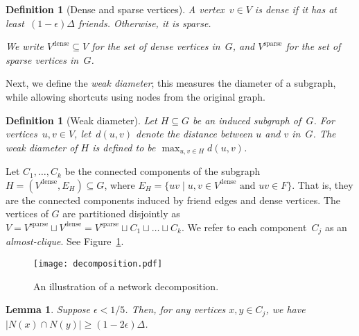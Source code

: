 \documentclass[11pt]{amsart}
\newtheorem{lemma}[theorem]{Lemma}
\newtheorem{definition}[theorem]{Definition}
\begin{document}
\begin{definition}[Dense and sparse vertices]
A vertex~$v \in V$ is \emph{dense} if it has at least~$(1-\epsilon)\Delta$ friends. Otherwise, it is \emph{sparse}.

We write $V^{\text{dense}} \subseteq V$ for the set of dense vertices in~$G$, and $V^{\text{sparse}}$ for the set of sparse vertices in~$G$.
\end{definition}

Next, we define the \emph{weak diameter}; this measures the diameter of a subgraph, while allowing shortcuts using nodes from the original graph.
\begin{definition}[Weak diameter]
Let $H \subseteq G$ be an induced subgraph of~$G$. For vertices~$u,v\in V$, let~$d(u,v)$ denote the distance between $u$ and $v$ in~$G$. The weak diameter of $H$ is defined to be $\max_{u,v \in H} d(u,v)$.
\end{definition}



Let $C_1, \ldots, C_k$ be the connected components of the subgraph $H = (V^{\text{dense}}, E_H ) \subseteq G$, where $E_H = \{uv \mid \mbox{$u,v \in V^{\text{dense}}$ and $uv \in F$} \}$. That is, they are the connected components induced by friend edges and dense vertices. The vertices of $G$ are partitioned disjointly as $V = V^{\text{sparse}} \sqcup V^{\text{dense}} = V^{\text{sparse}} \sqcup C_1 \sqcup \dots \sqcup C_k$. We refer to each component~$C_j$ as an \emph{almost-clique}. See Figure~\ref{fig:decomposition}.


\begin{figure}[t]
\centering
\texttt{[image: decomposition.pdf]}
\caption{An illustration of a network decomposition.}
\label{fig:decomposition}
\end{figure}


\begin{lemma}\label{lem:diameter}
Suppose $\epsilon < 1/5$. Then, for any vertices $x, y \in C_j$, we have $|N(x) \cap N(y)| \geq (1 - 2 \epsilon) \Delta$.
\end{lemma}
\end{document}
